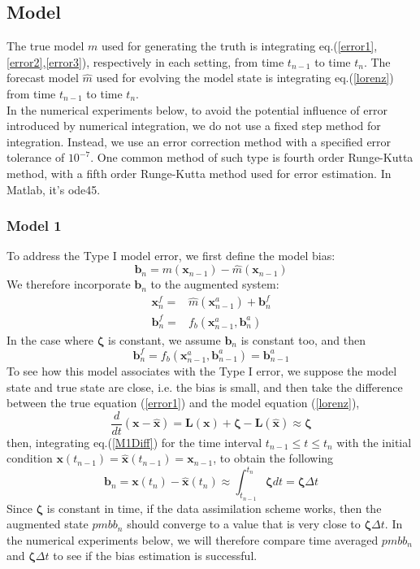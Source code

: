 \documentclass[twocolumn]{article}
\begin{document}
\subsection{Model} \label{models}
The true model $m$ used for generating the truth is integrating eq.(\ref{error1},\ref{error2},\ref{error3}), respectively in each setting, from time $t_{n-1}$ to time $t_{n}$. The forecast model $\hat{m}$ used for evolving the model state is integrating eq.(\ref{lorenz}) from time $t_{n-1}$ to time $t_{n}$.\\
In the numerical experiments below, to avoid the potential influence of error introduced by numerical integration, we do not use a fixed step method for integration. Instead, we use an error correction method with a specified error tolerance of $10^{-7}$. One common method of such type is fourth order Runge-Kutta method, with a fifth order Runge-Kutta method used for error estimation. In Matlab, it's ode45.
\subsubsection{Model 1} \label{model1}
To address the Type I model error, we first define the model bias:
\begin{equation}
\pmb{b}_{n}=m(\pmb{x}_{n-1})-\hat{m}(\pmb{x}_{n-1})
\end{equation}
We therefore incorporate $\pmb{b}_n$ to the augmented system:
\begin{align}
\pmb{x}_{n}^{f}=&\hat{m}(\pmb{x}_{n-1}^{a})+\pmb{b}_{n}^{f}\\
\pmb{b}_{n}^{f}=&f_{b}(\pmb{x}_{n-1}^{a},\pmb{b}_{n}^{a})
\end{align}
In the case where $\pmb{\zeta}$ is constant, we assume $\pmb{b}_n$ is constant too, and then
\begin{equation}
\pmb{b}_{n}^{f}=f_{b}(\pmb{x}_{n-1}^{a},\pmb{b}_{n-1}^{a})=\pmb{b}_{n-1}^{a}
\end{equation}
To see how this model associates with the Type I error, we suppose the model state and true state are close, i.e. the bias is small, and then take the difference between the true equation (\ref{error1}) and the model equation (\ref{lorenz}),
\begin{equation} \label{M1Diff}
\dfrac{d}{dt}(\pmb{x}-\hat{\pmb{x}})=\pmb{L}(\pmb{x})+\pmb{\zeta}-\pmb{L}(\hat{\pmb{x}})\approx\pmb{\zeta}
\end{equation}
then, integrating eq.(\ref{M1Diff}) for the time interval $t_{n-1}\leq t\leq t_n$ with the initial condition $\pmb{x}(t_{n-1})=\hat{\pmb{x}}(t_{n-1})=\pmb{x}_{n-1}$, to obtain the following
\begin{equation} \label{b&zeta}
\pmb{b}_n=\pmb{x}(t_{n})-\hat{\pmb{x}}(t_{n})\approx\int_{t_{n-1}}^{t_n}\pmb{\zeta}dt=\pmb{\zeta}\Delta t
\end{equation}
Since $\pmb{\zeta}$ is constant in time, if the data assimilation scheme works, then the augmented state $pmb{b}_n$ should converge to a value that is very close to $\pmb{\zeta}\Delta t$. In the numerical experiments below, we will therefore compare time averaged $pmb{b}_n$ and $\pmb{\zeta}\Delta t$ to see if the bias estimation is successful.
\end{document}
